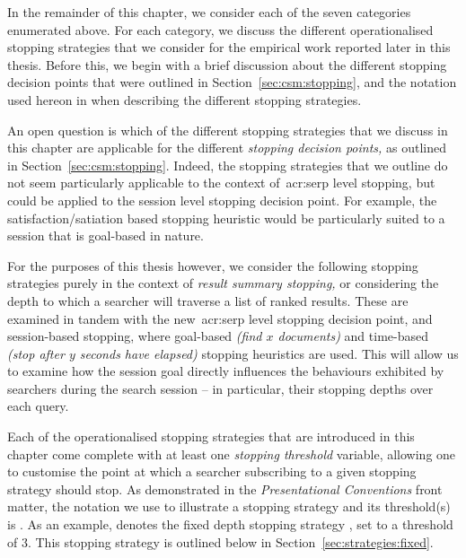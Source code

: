 In the remainder of this chapter, we consider each of the seven categories enumerated above. For each category, we discuss the different operationalised stopping strategies that we consider for the empirical work reported later in this thesis. Before this, we begin with a brief discussion about the different stopping decision points that were outlined in Section~\ref{sec:csm:stopping}, and the notation used hereon in when describing the different stopping strategies.

An open question is which of the different stopping strategies that we discuss in this chapter are applicable for the different \emph{stopping decision points,} as outlined in Section~\ref{sec:csm:stopping}. Indeed, the stopping strategies that we outline do not seem particularly applicable to the context of~\gls{acr:serp} level stopping, but could be applied to the session level stopping decision point. For example, the satisfaction/satiation based stopping heuristic would be particularly suited to a session that is goal-based in nature.

For the purposes of this thesis however, we consider the following stopping strategies purely in the context of \emph{result summary stopping,} or considering the depth to which a searcher will traverse a list of ranked results. These are examined in tandem with the new~\gls{acr:serp} level stopping decision point, and session-based stopping, where goal-based \emph{(find $x$ documents)} and time-based \emph{(stop after $y$ seconds have elapsed)} stopping heuristics are used. This will allow us to examine how the session goal directly influences the behaviours exhibited by searchers during the search session -- in particular, their stopping depths over each query.

Each of the operationalised stopping strategies that are introduced in this chapter come complete with at least one \emph{stopping threshold} variable, allowing one to customise the point at which a searcher subscribing to a given stopping strategy should stop. As demonstrated in the \emph{Presentational Conventions} front matter, the notation we use to illustrate a stopping strategy and its threshold(s) is . As an example,  denotes the fixed depth stopping strategy , set to a threshold of $3$. This stopping strategy is outlined below in Section~\ref{sec:strategies:fixed}.

